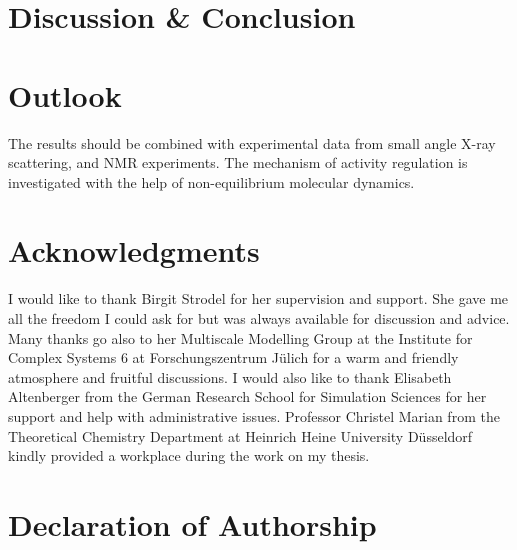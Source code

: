 \documentclass[english, a4paper, 12pt, titlepage, draft]{article}
\begin{document}

\section{Discussion \& Conclusion}


\section{Outlook}
The results should be combined with experimental data from small angle X-ray scattering, and NMR experiments. The mechanism of activity regulation is investigated with the help of non-equilibrium molecular dynamics.



\pagebreak

\section{Acknowledgments}

I would like to thank Birgit Strodel for her supervision and support.
She gave me all the freedom I could ask for but was always available for discussion and advice.
Many thanks go also to her Multiscale Modelling Group at the Institute for Complex Systems 6 at Forschungszentrum J\"ulich for a warm and friendly atmosphere and fruitful discussions.
I would also like to thank Elisabeth Altenberger from the German Research School for Simulation Sciences for her support and help with administrative issues.
Professor Christel Marian from the Theoretical Chemistry Department at Heinrich Heine University D\"usseldorf kindly provided a workplace during the work on my thesis.



\section{Declaration of Authorship}
\end{document}

